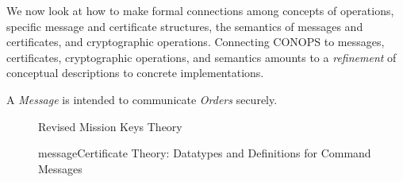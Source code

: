 We now look at how to make formal connections among concepts of
operations, specific message and certificate structures, the semantics
of messages and certificates, and cryptographic operations. Connecting
CONOPS to messages, certificates, cryptographic operations, and
semantics amounts to a \emph{refinement} of conceptual descriptions to
concrete implementations.


A \emph{Message} is intended to communicate \emph{Orders} securely.  



\begin{figure}[tb]
  \centering
  \HOLrevisedMissionKeysDatatypesmissionCA
  \HOLrevisedMissionKeysDatatypesmissionPrincipals
  \HOLrevisedMissionKeysDatatypesmissionStaffCA
  \caption{Revised Mission Keys Theory}
  \label{fig:revised-mission-keys}
\end{figure}


\begin{figure}[tb]
  \centering
  \begin{minipage}{1.0\linewidth}
    \HOLmessageCertificateDatatypesOrders
    \HOLmessageCertificateDatatypesOrigin
    \HOLmessageCertificateDatatypesRole
    \HOLmessageCertificateDatatypesDestination
    \HOLmessageCertificateDatatypesMessage
    \vspace*{-0.1in}
    \HOLmessageCertificateDefinitionscheckMSGXXdef
    \vspace*{-0.1in}
    \HOLmessageCertificateDefinitionsEmsgXXdef
    \vspace*{-0.1in}
    \HOLmessageCertificateDefinitionsmsatXXdef
  \end{minipage}

  \caption{messageCertificate Theory: Datatypes and Definitions for Command Messages}
  \label{fig:messageCertificate-messages}
\end{figure}

